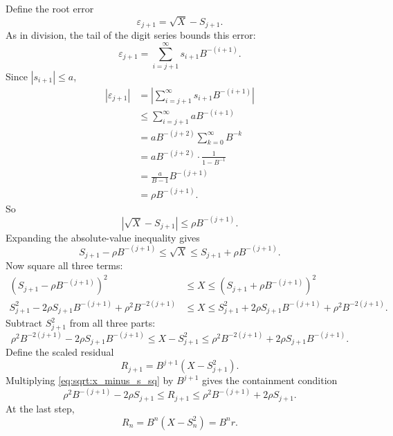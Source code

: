 \documentclass[11pt]{article}
\numberwithin{equation}{section}
\begin{document}
Define the root error
\begin{equation}
  \label{eq:sqrt:error_def}
  \varepsilon_{j+1} = \sqrt{X} - S_{j+1}.
\end{equation}
As in division, the tail of the digit series bounds this error:
\begin{equation}
  \label{eq:sqrt:error_tail}
  \varepsilon_{j+1} = \sum_{i=j+1}^{\infty} s_{i+1}B^{-(i+1)}.
\end{equation}
Since $|s_{i+1}|\le a$,
\begin{align}
  \left|\varepsilon_{j+1}\right|
  &= \left|\sum_{i=j+1}^{\infty} s_{i+1}B^{-(i+1)}\right| \nonumber \\
  &\le \sum_{i=j+1}^{\infty} a B^{-(i+1)} \nonumber \\
  &= a B^{-(j+2)} \sum_{k=0}^{\infty} B^{-k} \nonumber \\
  &= a B^{-(j+2)} \cdot \frac{1}{1-B^{-1}} \nonumber \\
  &= \frac{a}{B-1} B^{-(j+1)} \nonumber \\
  &= \rho B^{-(j+1)}.
  \label{eq:sqrt:error_bound}
\end{align}
So
\begin{equation}
  \label{eq:sqrt:error_bound_simple}
  \left|\sqrt{X} - S_{j+1}\right| \le \rho B^{-(j+1)}.
\end{equation}
Expanding the absolute-value inequality gives
\begin{equation}
  \label{eq:sqrt:error_interval}
  S_{j+1} - \rho B^{-(j+1)} \le \sqrt{X} \le S_{j+1} + \rho B^{-(j+1)}.
\end{equation}
Now square all three terms:
\begin{align}
  \left(S_{j+1}-\rho B^{-(j+1)}\right)^2
  &\le X \le
  \left(S_{j+1}+\rho B^{-(j+1)}\right)^2 \nonumber \\
  S_{j+1}^2 - 2\rho S_{j+1}B^{-(j+1)} + \rho^2B^{-2(j+1)}
  &\le X \le
  S_{j+1}^2 + 2\rho S_{j+1}B^{-(j+1)} + \rho^2B^{-2(j+1)}.
  \label{eq:sqrt:squared_error_interval}
\end{align}
Subtract $S_{j+1}^2$ from all three parts:
\begin{equation}
  \label{eq:sqrt:x_minus_s_sq}
  \rho^2B^{-2(j+1)} - 2\rho S_{j+1}B^{-(j+1)}
  \le X-S_{j+1}^2 \le
  \rho^2B^{-2(j+1)} + 2\rho S_{j+1}B^{-(j+1)}.
\end{equation}
Define the scaled residual
\begin{equation}
  \label{eq:sqrt:residual_def}
  R_{j+1} = B^{j+1}(X-S_{j+1}^2).
\end{equation}
Multiplying \cref{eq:sqrt:x_minus_s_sq} by $B^{j+1}$ gives the containment condition
\begin{equation}
  \label{eq:sqrt:containment}
  \rho^2B^{-(j+1)} - 2\rho S_{j+1}
  \le R_{j+1} \le
  \rho^2B^{-(j+1)} + 2\rho S_{j+1}.
\end{equation}
At the last step,
\begin{equation}
  \label{eq:sqrt:final_remainder}
  R_n = B^n(X-S_n^2) = B^n r.
\end{equation}
\end{document}
